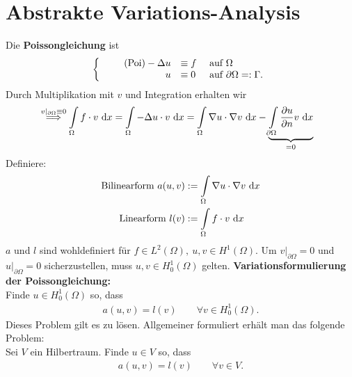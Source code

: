 \section{Abstrakte Variations-Analysis}
Die \textbf{Poissongleichung} ist
\begin{align}
	\left\{
	\begin{array}{r l l}\label{PoissonEquation}\tag{Poi}
		-\Delta u &\equiv f &\text{ auf }\Omega \\
		u &\equiv 0 &\text{ auf }\partial\Omega=:\Gamma.
	\end{array}\right.
\end{align}
Durch Multiplikation mit $v$ und Integration erhalten wir
\begin{align*}
&\stackrel{ v|_{\partial\Omega}\equiv0}{\implies}
\int\limits_\Omega f\cdot v\text{ d} x
=\int\limits_\Omega-\Delta u\cdot v\text{ d} x
=\int\limits_\Omega\nabla u\cdot\nabla v\text{ d} x-\underbrace{\int\limits_{\partial\Omega}\frac{\partial u}{\partial n}v\text{ d} x}_{=0}
\end{align*}
Definiere:
\begin{align*}
\text{Bilinearform } a(u,v)&:=\int\limits_\Omega\nabla u\cdot\nabla v\text{ d} x\\
\text{Linearform } l(v)&:=\int\limits_\Omega f\cdot v\text{ d} x
\end{align*}
$a$ und $l$ sind wohldefiniert für $f\in L^2(\Omega),~u,v\in H^1(\Omega)$. Um $v|_{\partial\Omega}=0$ und $u|_{\partial\Omega}=0$ sicherzustellen, muss $u,v\in H^1_0(\Omega)$ gelten.\nl
\textbf{Variationsformulierung der Poissongleichung:}\\
Finde $u\in H_0^1(\Omega)$ so, dass
\begin{align*}
a(u,v)=l(v)\qquad\forall v\in H^1_0(\Omega).
\end{align*}
Dieses Problem gilt es zu lösen. Allgemeiner formuliert erhält man das folgende Problem:\\
Sei $V$ ein Hilbertraum. Finde $u\in V$ so, dass
\begin{align*}
a(u,v)=l(v)\qquad\forall v\in V.
\end{align*}

